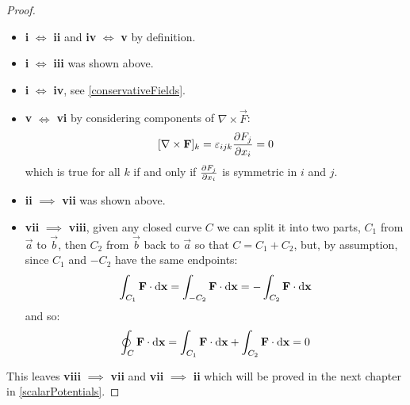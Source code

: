 \documentclass[../main.tex]{subfiles}
\begin{document}
\begin{proof}
  \begin{itemize}
    \item \textbf{i} $\iff$ \textbf{ii} and \textbf{iv} $\iff$ \textbf{v} by definition.
    \item \textbf{i} $\iff$ \textbf{iii} was shown above.
    \item \textbf{i} $\iff$ \textbf{iv}, see \cref{conservativeFields}.
    \item \textbf{v} $\iff$ \textbf{vi} by considering components of $\nabla \times \vec{F}$:
      \[
        [\nabla \times \vec{F}]_k = \levi_{i j k} \pderiv{F_j}{x_i} = 0
      \]
      which is true for all $k$ if and only if $\pderiv{F_j}{x_i}$ is symmetric in $i$ and $j$.
    \item \textbf{ii} $\implies$ \textbf{vii} was shown above.
    \item \textbf{vii} $\implies$ \textbf{viii}, given any closed curve $C$ we can split it into two parts, $C_1$ from $\vec{a}$ to $\vec{b}$, then $C_2$ from $\vec{b}$ back to $\vec{a}$ so that $C = C_1 + C_2$, but, by assumption, since $C_1$ and $-C_2$ have the same endpoints:
      \[
        \int_{C_1} \vec{F} \cdot \d{\vec{x}} = \int_{-C_2} \vec{F} \cdot \d{\vec{x}} = - \int_{C_2} \vec{F} \cdot \d{\vec{x}}
      \]
      and so:
      \[
        \oint_C \vec{F} \cdot \d{\vec{x}} = \int_{C_1} \vec{F} \cdot \d{\vec{x}} + \int_{C_2} \vec{F} \cdot \d{\vec{x}} = 0
      \]
  \end{itemize}
  This leaves \textbf{viii} $\implies$ \textbf{vii} and \textbf{vii} $\implies$ \textbf{ii} which will be proved in the next chapter in \cref{scalarPotentials}.
\end{proof}
\end{document}
